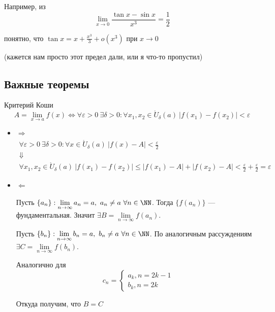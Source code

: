 Например, из
\[
    \lim\limits_{x \to 0} \frac{\tan x - \sin x}{x^3} = \frac{1}{2}
\]

понятно, что \( \tan x = x + \frac{x^3}{3} + o(x^3) \) при \( x \to 0 \)

(кажется нам просто этот предел дали, или я что-то пропустил)

\newpage

\subsection{Важные теоремы}

\begin{thrm}{Критерий Коши}{}
    \[
        A = \lim\limits_{x \to a} f(x) 
        \Leftrightarrow 
        \forall \varepsilon > 0 \ \exists \delta > 0 :
        \forall x_1, x_2 \in \mathring{U}_\delta(a) \ | f(x_1) - f(x_2) | < \varepsilon
    \]
\end{thrm}

\begin{itemize}
    \item
        \( \Rightarrow \)
        \begin{gather*}
            \forall \varepsilon > 0 \ \exists \delta > 0 : \forall x \in \mathring{U}_\delta(a) \ |f(x) - A| < \frac{\varepsilon}{2}
            \\
            \Downarrow
            \\
            \forall x_1, x_2 \in \mathring{U}_\delta(a) \
                |f(x_1) - f(x_2)| \leq |f(x_1) - A| + |f(x_2) - A| < \frac{\varepsilon}{2} + \frac{\varepsilon}{2} = \varepsilon
        \end{gather*}
    \item
        \( \Leftarrow \)

        Пусть \( \{ a_n \} : \lim\limits_{n \to \infty} a_n = a, \ a_n \neq a \ \forall n \in \NN \).
        Тогда \( \{ f(a_n) \} \) --- фундаментальная.
        Значит \( \exists B = \lim\limits_{n \to \infty} f(a_n) \).

        Пусть \( \{ b_n \} : \lim\limits_{n \to \infty} b_n = a, \ b_n \neq a \ \forall n \in \NN \).
        По аналогичным рассуждениям \( \exists C = \lim\limits_{n \to \infty} f(b_n) \).

        Аналогично для
        \[
            c_n = \begin{cases}
                a_k, n = 2k - 1
                \\
                b_k, n = 2k
            \end{cases}
        \]

        Откуда получим, что \( B = C \)
\end{itemize}

